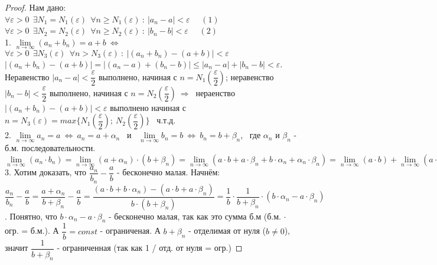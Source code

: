 \documentclass[12pt]{article}
\begin{document}
\begin{proof}
    Нам дано: \\
    $\forall \varepsilon  > 0 \ \ \exists N_1 = N_1(\varepsilon) \ \ \forall n \geq N_1(\varepsilon) \ : \  |a_n - a| < \varepsilon$ \ \ $(1)$ \\
    $\forall \varepsilon  > 0 \ \ \exists N_2 = N_2(\varepsilon) \ \ \forall n \geq N_2(\varepsilon) \ : \  |b_n - b| < \varepsilon$ \ \ $(2)$ \\
        1. $\lim\limits_{n \to \infty} (a_n + b_n) = a + b \ \Leftrightarrow \ $  $\forall \varepsilon > 0 \ \ \exists N_3(\varepsilon) \ \ \forall n > N_3(\varepsilon) \ : \  |(a_n+b_n) - (a + b)| < \varepsilon$ \\
        $|(a_n+b_n) - (a + b)| = |(a_n - a) + (b_n - b)| \leq |a_n - a| + |b_n - b| < \varepsilon$. \\
        Неравенство $|a_n-a| < \dfrac{\varepsilon}{2}$ выполнено, начиная с $n = N_1\left(\dfrac{\varepsilon}{2}\right)$; неравенство  $|b_n-b| < \dfrac{\varepsilon}{2}$ выполнено, начиная с $n = N_2\left(\dfrac{\varepsilon}{2}\right) \ \Rightarrow \ $ нераенство $ |(a_n+b_n) - (a + b)| < \varepsilon$ выполнено начиная с $n = N_3(\varepsilon) = max\{N_1\left(\dfrac{\varepsilon}{2}\right); \ N_2\left(\dfrac{\varepsilon}{2}\right)\}$  \ ч.т.д. \\
        2.  $\lim\limits_{n \to \infty} a_n = a \ \Leftrightarrow \ a_n = a + \alpha_n$ \ и \ $\lim\limits_{n \to \infty} b_n = b \ \Leftrightarrow \ b_n = b + \beta_n$, \ где $\alpha_n$ и $\beta_n$ - б.м. последовательности. \\
        $\lim\limits_{n \to \infty} (a_n \cdot b_n) = \lim\limits_{n \to \infty} (a + \alpha_n) \cdot (b + \beta_n) = \lim\limits_{n \to \infty} (a \cdot b + a \cdot \beta_n + b \cdot \alpha_n + \alpha_n \cdot \beta_n) = \lim\limits_{n \to \infty} (a \cdot b) + \lim\limits_{n \to \infty} (a \cdot \beta_n) + \lim\limits_{n \to \infty} (b \cdot \alpha_n) + \lim\limits_{n \to \infty} (\alpha_n \cdot \beta_n) = a \cdot b + 0 + 0 + 0 = a \cdot b$  \\
        3. Хотим доказать, что $\dfrac{a_n}{b_n} - \dfrac{a}{b}$ - бесконечно малая. Начнём: \\
        $\dfrac{a_n}{b_n} - \dfrac{a}{b} = \dfrac{a + \alpha_n}{b + \beta_n} - \dfrac{a}{b} = \dfrac{(a\cdot b + b \cdot \alpha_n) - (a \cdot b + a \cdot \beta_n)}{b \cdot (b + \beta_n)} = \dfrac{1}{b} \cdot \dfrac{1}{b + \beta_n} \cdot (b\cdot \alpha_n - a\cdot \beta_n)$. Понятно, что $b\cdot \alpha_n - a\cdot \beta_n$ - бесконечно малая, так как это сумма б.м (б.м. $\cdot$ огр. = б.м.). А $\dfrac{1}{b} = const$ - ограниченая. А $b + \beta_n$ - отделимая от нуля ($b \neq 0$), значит $\dfrac{1}{b + \beta_n}$ - ограниченная (так как 1 / отд. от нуля = огр.) 
\end{proof}
\end{document}
